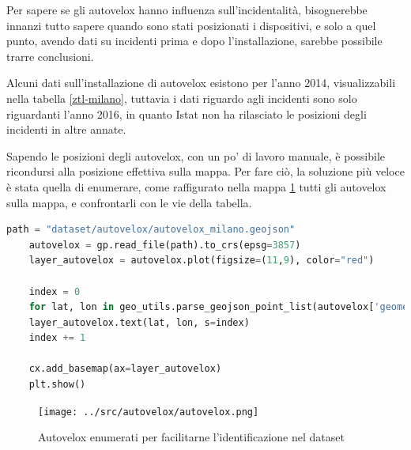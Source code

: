 \documentclass[a4paper]{report}
\begin{document}
Per sapere se gli autovelox hanno influenza sull'incidentalità, 
bisognerebbe innanzi tutto sapere quando sono stati posizionati i dispositivi, e solo a quel punto, 
avendo dati su incidenti prima e dopo l'installazione, sarebbe possibile trarre conclusioni.

Alcuni dati sull'installazione di autovelox esistono per l'anno 2014, visualizzabili nella 
tabella \ref{ztl-milano}, tuttavia i dati 
riguardo agli incidenti sono solo riguardanti l'anno 2016, in quanto Istat non ha rilasciato 
le posizioni degli incidenti in altre annate.

Sapendo le posizioni degli autovelox, con un po' di lavoro manuale, è possibile ricondursi alla 
posizione effettiva sulla mappa.
Per fare ciò, la soluzione più veloce è stata quella di enumerare, 
come raffigurato nella mappa \ref{fig:autovelox-indici} tutti gli autovelox sulla mappa, 
e confrontarli con le vie della tabella.

\begin{lstlisting}[language=Python]
    path = "dataset/autovelox/autovelox_milano.geojson"
    autovelox = gp.read_file(path).to_crs(epsg=3857)
    layer_autovelox = autovelox.plot(figsize=(11,9), color="red")
    
    index = 0
    for lat, lon in geo_utils.parse_geojson_point_list(autovelox['geometry'].astype(str)):
    layer_autovelox.text(lat, lon, s=index)
    index += 1
    
    cx.add_basemap(ax=layer_autovelox)
    plt.show()
\end{lstlisting}

\begin{figure}
    \texttt{[image: ../src/autovelox/autovelox.png]}
    \caption{Autovelox enumerati per facilitarne l'identificazione nel dataset}
    \label{fig:autovelox-indici}
\end{figure}
\end{document}
